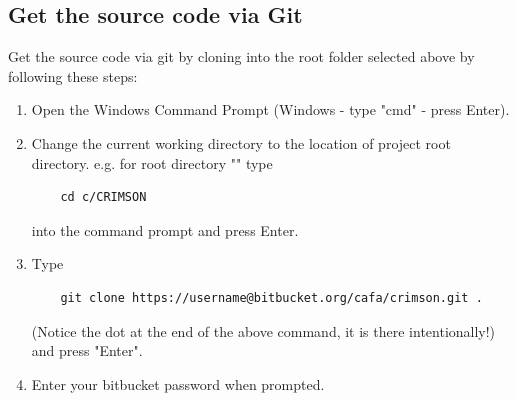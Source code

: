 \documentclass[]{scrartcl}
\begin{document}
\subsection{Get the source code via Git}
Get the source code via git by cloning into the root folder selected above by following these steps:

\begin{enumerate}
	\item Open the Windows Command Prompt (Windows - type "cmd" - press Enter).
	\item Change the current working directory to the location of project root directory. e.g. for root directory "" type 
	\begin{lstlisting}
	cd c/CRIMSON
	\end{lstlisting} 
	into the command prompt and press Enter.
	\item Type 
	\begin{lstlisting}
	git clone https://username@bitbucket.org/cafa/crimson.git .
	\end{lstlisting}
	(Notice the dot at the end of the above command, it is there intentionally!)
	\\and press "Enter". 
	\item Enter your bitbucket password when prompted.
\end{enumerate}
\end{document}
